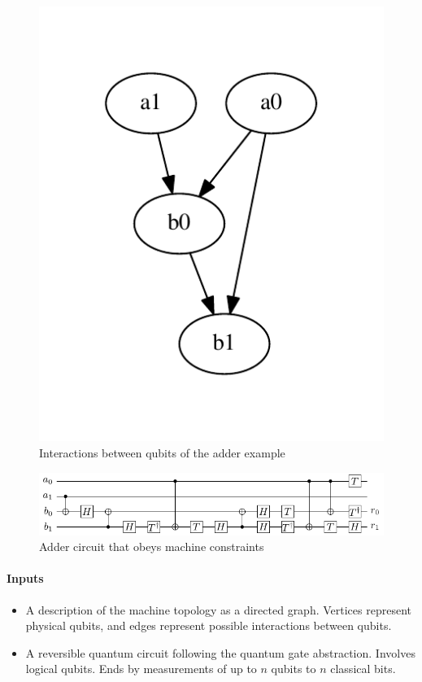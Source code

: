 \documentclass[11pt,a4paper]{article}
\begin{document}
\begin{figure}[htb]
\centering
\includegraphics[scale=.5]{fig/adder_interact}
\caption{Interactions between qubits of the adder example}
\label{fig:adder_interact}
\end{figure}

\begin{figure}[htb]
\centering
\includegraphics[scale=1]{fig/adder_reverse}
\caption{Adder circuit that obeys machine constraints}
\label{fig:adder_reverse}
\end{figure}

\paragraph{Inputs}
\begin{itemize}
\item A description of the machine topology as a directed graph. Vertices represent physical qubits, and edges represent possible interactions between qubits.
\item A reversible quantum circuit following the quantum gate abstraction. Involves logical qubits.
Ends by measurements of up to $n$ qubits to $n$ classical bits.
\end{itemize}
\end{document}
